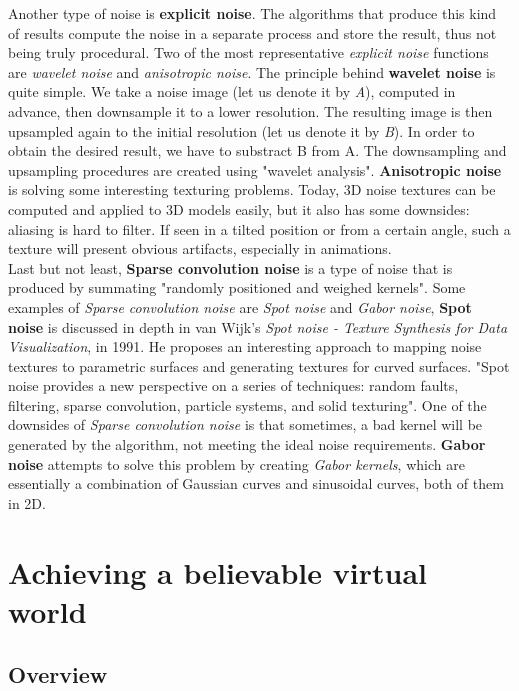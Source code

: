 Another type of noise is \textbf{explicit noise}. The algorithms that produce this kind of results compute the noise in a separate process and store the result, thus not being truly procedural. Two of the most representative \textit{explicit noise} functions are \textit{wavelet noise} and \textit{anisotropic noise}. The principle behind \textbf{wavelet noise} is quite simple. We take a noise image (let us denote it by \textit{A}), computed in advance, then downsample it to a lower resolution. The resulting image is then upsampled again to the initial resolution (let us denote it by \textit{B}). In order to obtain the desired result, we have to substract B from A. The downsampling and upsampling procedures are created using "wavelet analysis"\cite{lagae2010survey}. \textbf{Anisotropic noise}\cite{goldberg2008anisotropic} is solving some interesting texturing problems. Today, 3D noise textures can be computed and applied to 3D models easily, but it also has some downsides: aliasing is hard to filter. If seen in a tilted position or from a certain angle, such a texture will present obvious artifacts, especially in animations.\\

Last but not least, \textbf{Sparse convolution noise} is a type of noise that is produced by summating "randomly positioned and weighed kernels"\cite{lagae2010survey}. Some examples of \textit{Sparse convolution noise} are \textit{Spot noise} and \textit{Gabor noise}, \textbf{Spot noise} is discussed in depth in van Wijk's \textit{Spot noise - Texture Synthesis for Data Visualization}, in 1991. He proposes an interesting approach to mapping noise textures to parametric surfaces and generating textures for curved surfaces. "Spot noise provides a new perspective on a series of techniques: random faults, filtering, sparse convolution, particle
systems, and solid texturing"\cite{van1991spot}. One of the downsides of \textit{Sparse convolution noise} is that sometimes, a bad kernel will be generated by the algorithm, not meeting the ideal noise requirements. \textbf{Gabor noise} attempts to solve this problem by creating \textit{Gabor kernels}, which are essentially a combination of Gaussian curves and sinusoidal curves, both of them in 2D\cite{lagae2009procedural}.

\section{Achieving a believable virtual world}

\subsection{Overview}

